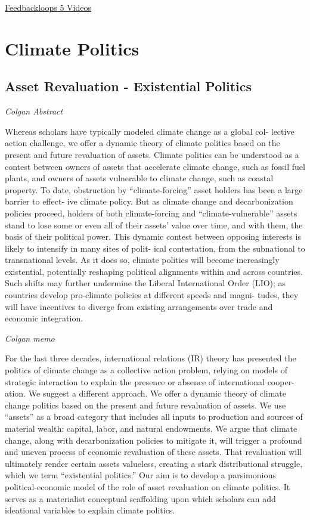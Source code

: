 \documentclass[
]{book}
\begin{document}
\href{https://feedbackloopsclimate.com/introduction/}{Feedbackloops 5 Videos}

\hypertarget{climate-politics}{%
\chapter{Climate Politics}\label{climate-politics}}

\hypertarget{asset-revaluation---existential-politics}{%
\section{Asset Revaluation - Existential Politics}\label{asset-revaluation---existential-politics}}

\emph{Colgan Abstract}

Whereas scholars have typically modeled climate change as a global col-
lective action challenge, we offer a dynamic theory of climate politics based on the
present and future revaluation of assets. Climate politics can be understood as a
contest between owners of assets that accelerate climate change, such as fossil fuel
plants, and owners of assets vulnerable to climate change, such as coastal property.
To date, obstruction by ``climate-forcing'' asset holders has been a large barrier to effect-
ive climate policy. But as climate change and decarbonization policies proceed, holders
of both climate-forcing and ``climate-vulnerable'' assets stand to lose some or even all of
their assets' value over time, and with them, the basis of their political power. This
dynamic contest between opposing interests is likely to intensify in many sites of polit-
ical contestation, from the subnational to transnational levels. As it does so, climate
politics will become increasingly existential, potentially reshaping political alignments
within and across countries. Such shifts may further undermine the Liberal International
Order (LIO); as countries develop pro-climate policies at different speeds and magni-
tudes, they will have incentives to diverge from existing arrangements over trade and
economic integration.

\emph{Colgan memo}

For the last three decades, international relations (IR) theory has presented the
politics of climate change as a collective action problem, relying on models of
strategic interaction to explain the presence or absence of international cooper-
ation. We suggest a different approach. We offer a dynamic theory of climate
change politics based on the present and future revaluation of assets. We use
``assets'' as a broad category that includes all inputs to production and sources of
material wealth: capital, labor, and natural endowments. We argue that climate
change, along with decarbonization policies to mitigate it, will trigger a profound
and uneven process of economic revaluation of these assets. That revaluation will
ultimately render certain assets valueless, creating a stark distributional struggle,
which we term ``existential politics.'' Our aim is to develop a parsimonious
political-economic model of the role of asset revaluation on climate politics. It
serves as a materialist conceptual scaffolding upon which scholars can add ideational
variables to explain climate politics.
\end{document}
